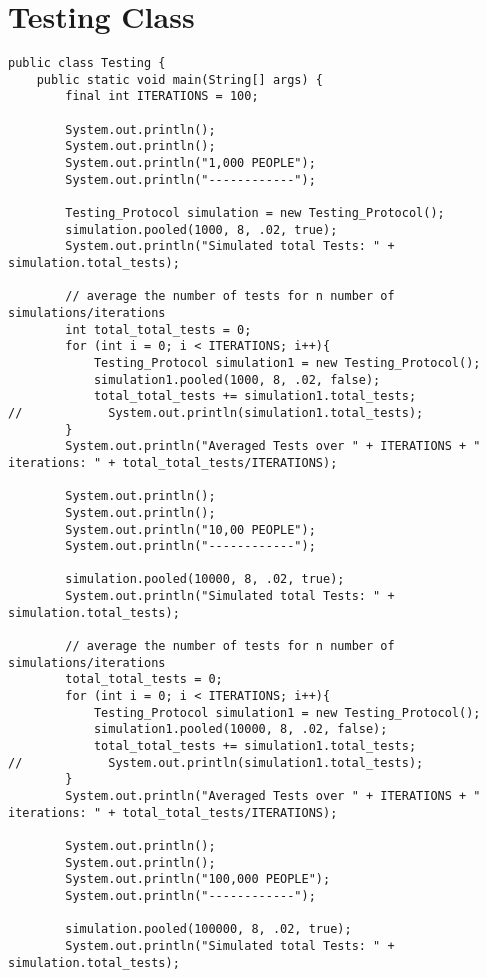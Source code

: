 \documentclass{article}
\begin{document}
\section{Testing Class}
\begin{lstlisting}
public class Testing {
    public static void main(String[] args) {
        final int ITERATIONS = 100;

        System.out.println();
        System.out.println();
        System.out.println("1,000 PEOPLE");
        System.out.println("------------");

        Testing_Protocol simulation = new Testing_Protocol();
        simulation.pooled(1000, 8, .02, true);
        System.out.println("Simulated total Tests: " + simulation.total_tests);

        // average the number of tests for n number of simulations/iterations
        int total_total_tests = 0;
        for (int i = 0; i < ITERATIONS; i++){
            Testing_Protocol simulation1 = new Testing_Protocol();
            simulation1.pooled(1000, 8, .02, false);
            total_total_tests += simulation1.total_tests;
//            System.out.println(simulation1.total_tests);
        }
        System.out.println("Averaged Tests over " + ITERATIONS + " iterations: " + total_total_tests/ITERATIONS);

        System.out.println();
        System.out.println();
        System.out.println("10,00 PEOPLE");
        System.out.println("------------");

        simulation.pooled(10000, 8, .02, true);
        System.out.println("Simulated total Tests: " + simulation.total_tests);

        // average the number of tests for n number of simulations/iterations
        total_total_tests = 0;
        for (int i = 0; i < ITERATIONS; i++){
            Testing_Protocol simulation1 = new Testing_Protocol();
            simulation1.pooled(10000, 8, .02, false);
            total_total_tests += simulation1.total_tests;
//            System.out.println(simulation1.total_tests);
        }
        System.out.println("Averaged Tests over " + ITERATIONS + " iterations: " + total_total_tests/ITERATIONS);

        System.out.println();
        System.out.println();
        System.out.println("100,000 PEOPLE");
        System.out.println("------------");

        simulation.pooled(100000, 8, .02, true);
        System.out.println("Simulated total Tests: " + simulation.total_tests);


\end{lstlisting}
\end{document}

